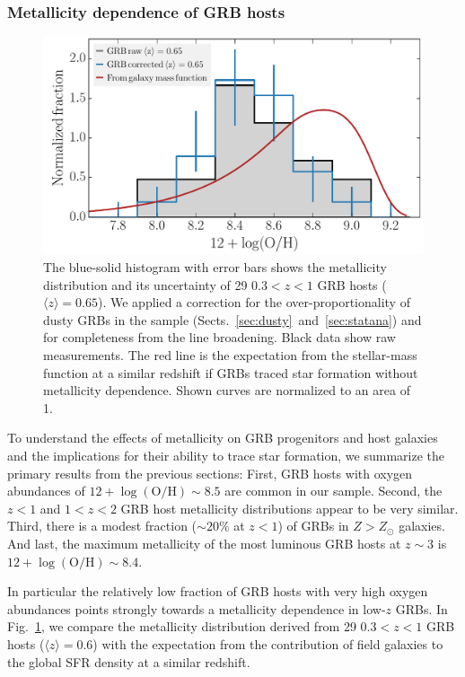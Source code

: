 \documentclass[traditabstract, longauth]{aa}
\newcommand{\oh}{12+\log(\mathrm{O/H})}
\begin{document}
\subsubsection{Metallicity dependence of GRB hosts}

\begin{figure}
\includegraphics[angle=0, width=0.99\columnwidth]{Figs/MetvsMass.pdf}
\caption{ {The blue-solid histogram with error bars shows the metallicity distribution and its uncertainty of 29 $0.3<z<1$ GRB hosts ($\langle z \rangle = 0.65$). We applied a correction for the over-proportionality of dusty GRBs in the sample (Sects.~\ref{sec:dusty}~and~\ref{sec:statana}) and for completeness from the line broadening. Black data show raw measurements. The red line is the expectation from the stellar-mass function at a similar redshift \citep{2014ApJ...783...85T} if GRBs traced star formation without metallicity dependence. Shown curves are normalized to an area of 1.}}
\label{fig:metvsmass}
\end{figure}

To understand the effects of metallicity on GRB progenitors and host galaxies and the implications for their ability to trace star formation, we summarize the primary results from the previous sections: First, GRB hosts with oxygen abundances of $\oh\sim8.5$ are common in our sample. Second, the $z<1$ and $1<z<2$ GRB host metallicity distributions appear to be very similar. Third, there is a modest fraction ($\sim 20\%$ at $z<1$) of GRBs in $Z > Z_{\odot}$ galaxies. And last, the maximum metallicity of the most luminous GRB hosts at $z\sim3$ is $\oh\sim8.4$.

{In particular the relatively low fraction of GRB hosts with very high oxygen abundances points strongly towards a metallicity dependence in low-$z$ GRBs.}  {In Fig.~\ref{fig:metvsmass}, we compare the metallicity distribution derived from 29 $0.3<z<1$ GRB hosts ($\langle z \rangle = 0.6$) with the expectation from the contribution of field galaxies to the global SFR density at a similar redshift. }
\end{document}
